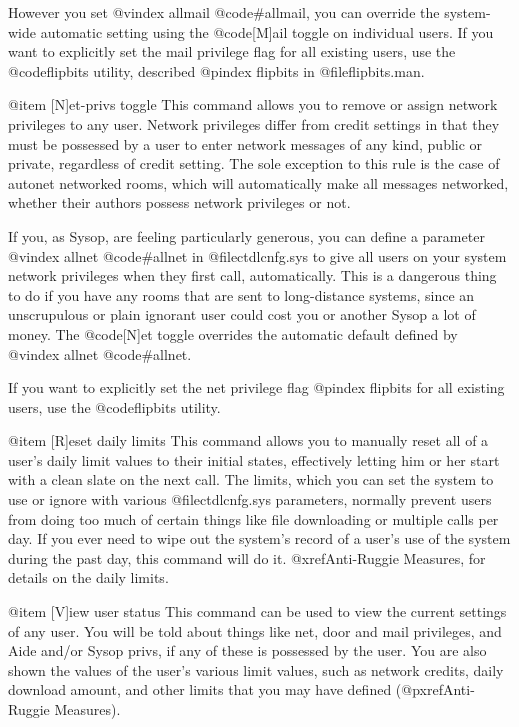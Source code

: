 However you set
@vindex allmail
@code{#allmail}, you can override the
system-wide automatic setting using the @code{[M]ail} toggle on
individual users.  If you want to explicitly set the mail privilege flag
for all existing users, use the @code{flipbits} utility, described
@pindex flipbits
in @file{flipbits.man}.

@item [N]et-privs toggle
This command allows you to remove or assign network
privileges to any user.  Network privileges differ from
credit settings in that they must be possessed by a user to
enter network messages of any kind, public or private,
regardless of credit setting.  The sole exception to this
rule is the case of autonet networked rooms, which will
automatically make all messages networked, whether their
authors possess network privileges or not.

If you, as Sysop, are feeling particularly generous,
you can define a parameter
@vindex allnet
@code{#allnet} in @file{ctdlcnfg.sys} to give
all users on your system network privileges when they first
call, automatically.
This is a dangerous thing to do if you have any rooms that
are sent to long-distance systems, since an unscrupulous or
plain ignorant user could cost you or another Sysop a lot
of money.  The @code{[N]et} toggle overrides the automatic default
defined by
@vindex allnet
@code{#allnet}.

If you want to explicitly set the net privilege flag
@pindex flipbits
for all existing users, use the @code{flipbits} utility.

@item [R]eset daily limits
This command allows you to manually reset all of a user's daily limit
values to their initial states, effectively letting him or her start with a
clean slate on the next call.  The limits, which you can set the system
to use or ignore with various @file{ctdlcnfg.sys} parameters, normally
prevent users from doing too much of certain things like file downloading
or multiple calls per day.  If you ever need to wipe out the system's
record of a user's use of the system during the past day, this command
will do it.  @xref{Anti-Ruggie Measures}, for details on the daily limits.

@item [V]iew user status
This command can be used to view the current settings
of any user.  You will be told about things like net, door and
mail privileges, and Aide and/or Sysop privs, if any of
these is possessed by the user.  You are also shown the
values of the user's various limit values, such as network
credits, daily download amount, and other limits that you
may have defined (@pxref{Anti-Ruggie Measures}).

